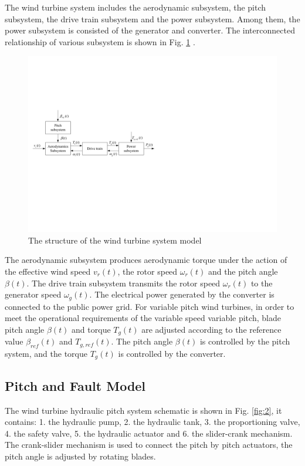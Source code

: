 \documentclass{article}
\begin{document}
The wind turbine system includes the aerodynamic subsystem, the pitch subsystem, the drive train
subsystem and the power subsystem. Among them, the power subsystem is consisted of the
generator and converter. The interconnected relationship of various subsystem is
shown in Fig. \ref{fig:1} \cite{ref:14}.

\begin{figure}[!htb]
  \centering
  \includegraphics[]{fig1.pdf}
  \caption{The structure of the wind turbine system model}
  \label{fig:1}
\end{figure}


The aerodynamic subsystem produces aerodynamic torque under the action of
the effective wind speed $v_r(t)$, the rotor speed $\omega_r(t)$ and
the pitch angle $\beta(t)$. The drive train subsystem transmits the rotor speed  $\omega_r(t)$
to the generator speed $\omega_g(t)$. The electrical power generated by the
converter is connected to the public power grid.
For variable pitch wind turbines, in order to meet the operational requirements
of the variable speed variable pitch, blade pitch angle $\beta(t)$ and torque $T_g(t)$
are adjusted according to  the reference value $\beta_{ref}(t)$ and $T_{g,ref}(t)$.
The pitch angle $\beta(t)$ is controlled by the pitch system, and the torque $T_g(t)$
is controlled by
the converter.



\subsection{Pitch and Fault Model}


The wind turbine hydraulic pitch system schematic is shown in Fig. \ref{fig:2},
it contains: 1. the hydraulic pump, 2. the hydraulic tank,
3. the proportioning valve, 4. the safety valve,
5. the hydraulic actuator and 6. the
slider-crank mechanism. The crank-slider mechanism
is used to connect the pitch by pitch actuators, the pitch angle is adjusted by
rotating blades.
\end{document}
